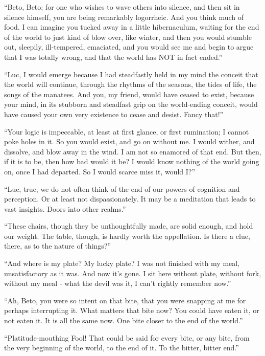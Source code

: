``Beto, Beto; for one who wishes to wave others into silence, and then
sit in silence himself, you are being remarkably logorrheic. And you
think much of food. I can imagine you tucked away in a little
hibernaculum, waiting for the end of the world to just kind of blow
over, like winter, and then you would stumble out, sleepily,
ill-tempered, emaciated, and you would see me and begin to argue that I
was totally wrong, and that the world has NOT in fact ended.''

``Luc, I would emerge because I had steadfastly held in my mind the
conceit that the world will continue, through the rhythms of the
seasons, the tides of life, the songs of the manatees. And you, my
friend, would have ceased to exist, because your mind, in its stubborn
and steadfast grip on the world-ending conceit, would have caused your
own very existence to cease and desist. Fancy that!''

``Your logic is impeccable, at least at first glance, or first
rumination; I cannot poke holes in it. So you would exist, and go on
without me. I would wither, and dissolve, and blow away in the wind. I
am not so enamored of that end. But then, if it is to be, then how bad
would it be? I would know nothing of the world going on, once I had
departed. So I would scarce miss it, would I?''

``Luc, true, we do not often think of the end of our powers of cognition
and perception. Or at least not dispassionately. It may be a meditation
that leads to vast insights. Doors into other realms.''

``These chairs, though they be unthoughtfully made, are solid enough,
and hold our weight. The table, though, is hardly worth the appellation.
Is there a clue, there, as to the nature of things?''

``And where is my plate? My lucky plate? I was not finished with my
meal, unsatisfactory as it was. And now it's gone. I sit here without
plate, without fork, without my meal - what the devil was it, I can't
rightly remember now.''

``Ah, Beto, you were so intent on that bite, that you were snapping at
me for perhaps interrupting it. What matters that bite now? You could
have eaten it, or not eaten it. It is all the same now. One bite closer
to the end of the world.''

``Platitude-mouthing Fool! That could be said for every bite, or any
bite, from the very beginning of the world, to the end of it. To the
bitter, bitter end.''

